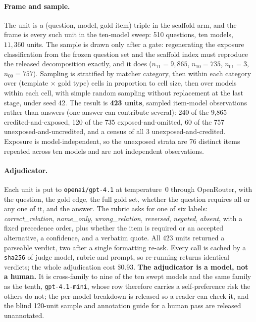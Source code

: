 \documentclass[10pt,twocolumn]{article}
\begin{document}
\paragraph{Frame and sample.} The unit is a (question, model, gold item) triple in the scaffold arm, and the frame is every such unit in the ten-model sweep: 510 questions, ten models, $11{,}360$ units. The sample is drawn only after a gate: regenerating the exposure classification from the frozen question set and the scaffold index must reproduce the released decomposition exactly, and it does ($n_{11}=9{,}865$, $n_{10}=735$, $n_{01}=3$, $n_{00}=757$). Sampling is stratified by matcher category, then within each category over (template $\times$ gold type) cells in proportion to cell size, then over models within each cell, with simple random sampling without replacement at the last stage, under seed 42. The result is \textbf{423 units}, sampled item-model observations rather than answers (one answer can contribute several): 240 of the 9{,}865 credited-and-exposed, 120 of the 735 exposed-and-omitted, 60 of the 757 unexposed-and-uncredited, and a census of all 3 unexposed-and-credited. Exposure is model-independent, so the unexposed strata are 76 distinct items repeated across ten models and are not independent observations.

\paragraph{Adjudicator.} Each unit is put to \texttt{openai/gpt-4.1} at temperature~0 through OpenRouter, with the question, the gold edge, the full gold set, whether the question requires all or any one of it, and the answer. The rubric asks for one of six labels: \emph{correct\_relation}, \emph{name\_only}, \emph{wrong\_relation}, \emph{reversed}, \emph{negated}, \emph{absent}, with a fixed precedence order, plus whether the item is required or an accepted alternative, a confidence, and a verbatim quote. All 423 units returned a parseable verdict, two after a single formatting re-ask. Every call is cached by a \texttt{sha256} of judge model, rubric and prompt, so re-running returns identical verdicts; the whole adjudication cost \$0.93. \textbf{The adjudicator is a model, not a human.} It is cross-family to nine of the ten swept models and the same family as the tenth, \texttt{gpt-4.1-mini}, whose row therefore carries a self-preference risk the others do not; the per-model breakdown is released so a reader can check it, and the blind 120-unit sample and annotation guide for a human pass are released unannotated.
\end{document}
